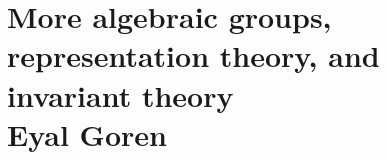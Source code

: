 \chapter{More algebraic groups, representation theory, and invariant theory \\ Eyal Goren}\label{ch:8}